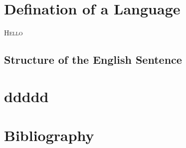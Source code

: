 \documentclass[a4paper,12pt]{article}
\title{\entitle}
\author{\enauthor}
\date{}
\begin{document}
\sloppy

\begin{titlepage}
\pagestyle{empty}








\renewcommand{\contentsname}{\begin{center}Contents\end{center}}

\end{titlepage}

\tableofcontents
\clearpage

\setcounter{page}{1}

\begin{onehalfspace}



\section{Defination of a Language}
\textsc{Hello}

\subsection{Structure of the English Sentence}



\section{ddddd}

\end{onehalfspace}
\section{Bibliography}


\end{document}
